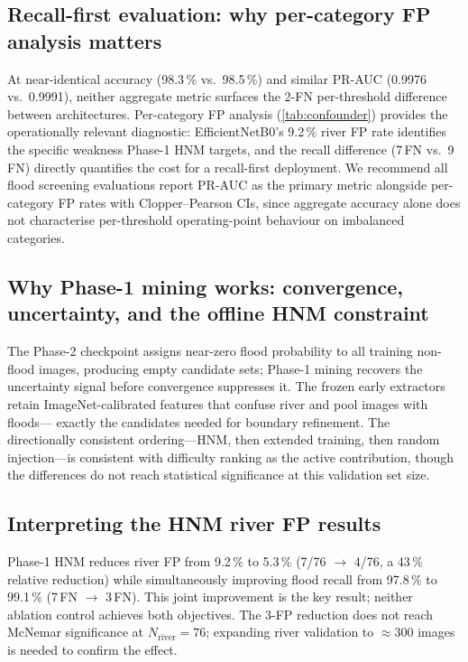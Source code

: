 \documentclass[a4paper,fleqn]{cas-sc}
\newcommand{\EffNet}{EfficientNetB0\xspace}
\newcommand{\PHNM}{Phase-1 HNM\xspace}
\newcommand{\PR}{PR-AUC\xspace}
\newcommand{\CP}{Clopper--Pearson\xspace}
\begin{document}
\subsection{Recall-first evaluation: why per-category FP analysis matters}
\label{sec:discussion:metric}

At near-identical accuracy (98.3\,\% vs.\ 98.5\,\%) and similar PR-AUC (0.9976 vs.\ 0.9991),
neither aggregate metric surfaces the 2-FN per-threshold difference between architectures.
Per-category FP analysis (\cref{tab:confounder}) provides the operationally relevant diagnostic:
\EffNet{}'s 9.2\,\% river FP rate identifies the specific weakness \PHNM{} targets,
and the recall difference (7\,FN vs.\ 9\,FN) directly quantifies the cost for a recall-first deployment.
We recommend all flood screening evaluations report \PR{} as the primary metric alongside
per-category FP rates with \CP{} CIs, since aggregate accuracy alone does not characterise
per-threshold operating-point behaviour on imbalanced categories.


\subsection{Why Phase-1 mining works: convergence, uncertainty, and the offline HNM constraint}
\label{sec:discussion:phase1}

The Phase-2 checkpoint assigns near-zero flood probability to all training non-flood images,
producing empty candidate sets; Phase-1 mining recovers the uncertainty signal before convergence suppresses it.
The frozen early extractors retain ImageNet-calibrated features that confuse river and pool images with floods---
exactly the candidates needed for boundary refinement.
The directionally consistent ordering---HNM, then extended training, then random injection---is consistent with difficulty ranking as the active contribution, though the differences do not reach statistical significance at this validation set size.

\subsection{Interpreting the HNM river FP results}
\label{sec:discussion:fp}

\PHNM{} reduces river FP from 9.2\,\% to 5.3\,\% (7/76 $\to$ 4/76, a 43\,\% relative reduction)
while simultaneously improving flood recall from 97.8\,\% to 99.1\,\% (7\,FN $\to$ 3\,FN).
This joint improvement is the key result; neither ablation control achieves both objectives.
The 3-FP reduction does not reach McNemar significance at $N_\text{river}{=}76$;
expanding river validation to $\approx$300 images is needed to confirm the effect.
\end{document}
